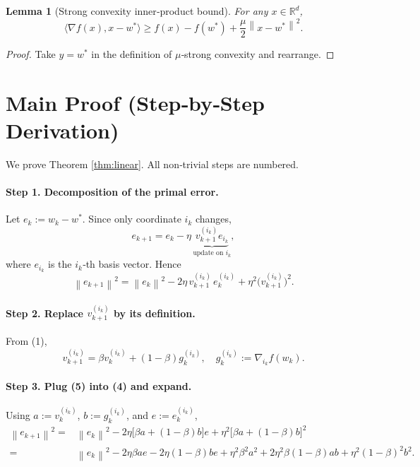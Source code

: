 \documentclass{article}
\newtheorem{lemma}{Lemma}
\newcommand{\R}{\mathbb{R}}
\newcommand{\norm}[1]{\left\|#1\right\|}
\newcommand{\ip}[2]{\langle #1,#2\rangle}
\begin{document}
\begin{lemma}[Strong convexity inner‑product bound]\label{lem:sc}
For any $x\in\R^{d}$,
\[
\ip{\nabla f(x)}{x-w^*}\ge f(x)-f(w^*)+\frac{\mu}{2}\norm{x-w^*}^{2}.
\]
\end{lemma}
\begin{proof}
Take $y=w^*$ in the definition of $\mu$‑strong convexity and rearrange.
\end{proof}

\section*{Main Proof (Step‑by‑Step Derivation)}
We prove Theorem \ref{thm:linear}.  All non‑trivial steps are numbered.

\paragraph{Step 1. Decomposition of the primal error.}
Let $e_k:=w_k-w^*$. Since only coordinate $i_k$ changes,
\[
e_{k+1}=e_k-\eta\,\underbrace{v_{k+1}^{(i_k)}e_{i_k}}_{\text{update on }i_k},
\]
where $e_{i_k}$ is the $i_k$‑th basis vector. Hence
\[
\norm{e_{k+1}}^{2}
= \norm{e_k}^{2}
-2\eta\,v_{k+1}^{(i_k)}\,e_{k}^{(i_k)}
+\eta^{2}\bigl(v_{k+1}^{(i_k)}\bigr)^{2}.
\tag{4}
\]

\paragraph{Step 2. Replace $v_{k+1}^{(i_k)}$ by its definition.}
From (1),
\[
v_{k+1}^{(i_k)}=\beta v_{k}^{(i_k)}+(1-\beta)g_{k}^{(i_k)},
\quad g_{k}^{(i_k)}:=\nabla_{i_k}f(w_k).
\tag{5}
\]

\paragraph{Step 3. Plug (5) into (4) and expand.}
Using $a:=v_{k}^{(i_k)}$, $b:=g_{k}^{(i_k)}$, and $e:=e_k^{(i_k)}$,
\[
\begin{aligned}
\norm{e_{k+1}}^{2}
=&\norm{e_k}^{2}
-2\eta\bigl[\beta a+(1-\beta)b\bigr]e
+\eta^{2}\bigl[\beta a+(1-\beta)b\bigr]^{2}  \\
=&\norm{e_k}^{2}
-2\eta\beta a e-2\eta(1-\beta) b e
+\eta^{2}\beta^{2}a^{2}+2\eta^{2}\beta(1-\beta)ab
+\eta^{2}(1-\beta)^{2}b^{2}.
\end{aligned}
\tag{6}
\]
\end{document}
